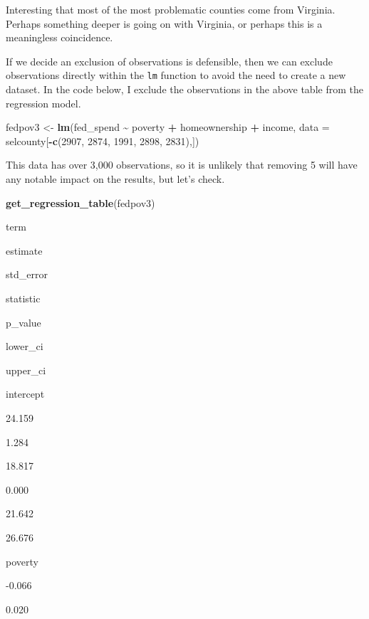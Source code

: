 \documentclass[
]{book}
\makeatletter
\newenvironment{Shaded}{\begin{snugshade}}{\end{snugshade}}
\newcommand{\AttributeTok}[1]{\textcolor[rgb]{0.27,0.27,0.27}{#1}}
\newcommand{\DecValTok}[1]{\textcolor[rgb]{0.06,0.06,0.06}{#1}}
\newcommand{\FunctionTok}[1]{\textcolor[rgb]{0.27,0.27,0.27}{\textbf{#1}}}
\newcommand{\NormalTok}[1]{#1}
\newcommand{\OtherTok}[1]{\textcolor[rgb]{0.37,0.37,0.37}{#1}}
\newcommand{\SpecialCharTok}[1]{\textcolor[rgb]{0.43,0.43,0.43}{\textbf{#1}}}
\newenvironment{kframe}{%
\medskip{}
\setlength{\fboxsep}{.8em}
 \def\at@end@of@kframe{}%
 \ifinner\ifhmode%
  \def\at@end@of@kframe{\end{minipage}}%
  \begin{minipage}{\columnwidth}%
 \fi\fi%
 \def\FrameCommand##1{\hskip\@totalleftmargin \hskip-\fboxsep
 \colorbox{shadecolor}{##1}\hskip-\fboxsep
     \hskip-\linewidth \hskip-\@totalleftmargin \hskip\columnwidth}%
 \MakeFramed {\advance\hsize-\width
   \@totalleftmargin\z@ \linewidth\hsize
   \@setminipage}}%
 {\par\unskip\endMakeFramed%
 \at@end@of@kframe}
\renewenvironment{Shaded}{\begin{kframe}}{\end{kframe}}
\makeatother
\begin{document}
Interesting that most of the most problematic counties come from Virginia. Perhaps something deeper is going on with Virginia, or perhaps this is a meaningless coincidence.

If we decide an exclusion of observations is defensible, then we can exclude observations directly within the \texttt{lm} function to avoid the need to create a new dataset. In the code below, I exclude the observations in the above table from the regression model.

\begin{Shaded}
\begin{Highlighting}[]
\NormalTok{fedpov3 }\OtherTok{\textless{}{-}} \FunctionTok{lm}\NormalTok{(fed\_spend }\SpecialCharTok{\textasciitilde{}}\NormalTok{ poverty }\SpecialCharTok{+}\NormalTok{ homeownership }\SpecialCharTok{+}\NormalTok{ income, }
              \AttributeTok{data =}\NormalTok{ selcounty[}\SpecialCharTok{{-}}\FunctionTok{c}\NormalTok{(}\DecValTok{2907}\NormalTok{, }\DecValTok{2874}\NormalTok{, }\DecValTok{1991}\NormalTok{, }\DecValTok{2898}\NormalTok{, }\DecValTok{2831}\NormalTok{),])}
\end{Highlighting}
\end{Shaded}

This data has over 3,000 observations, so it is unlikely that removing 5 will have any notable impact on the results, but let's check.

\begin{Shaded}
\begin{Highlighting}[]
\FunctionTok{get\_regression\_table}\NormalTok{(fedpov3)}
\end{Highlighting}
\end{Shaded}

term

estimate

std\_error

statistic

p\_value

lower\_ci

upper\_ci

intercept

24.159

1.284

18.817

0.000

21.642

26.676

poverty

-0.066

0.020
\end{document}
